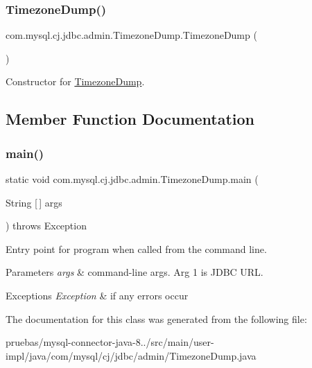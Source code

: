 \subsubsection{\texorpdfstring{Timezone\+Dump()}{TimezoneDump()}}
{\footnotesize\ttfamily com.\+mysql.\+cj.\+jdbc.\+admin.\+Timezone\+Dump.\+Timezone\+Dump (\begin{DoxyParamCaption}{ }\end{DoxyParamCaption})}

Constructor for \mbox{\hyperlink{classcom_1_1mysql_1_1cj_1_1jdbc_1_1admin_1_1_timezone_dump}{Timezone\+Dump}}. 

\subsection{Member Function Documentation}
\mbox{\label{classcom_1_1mysql_1_1cj_1_1jdbc_1_1admin_1_1_timezone_dump_a49fa078091ac273b24d35f0077227ab4}} 
\subsubsection{\texorpdfstring{main()}{main()}}
{\footnotesize\ttfamily static void com.\+mysql.\+cj.\+jdbc.\+admin.\+Timezone\+Dump.\+main (\begin{DoxyParamCaption}\item[{String \mbox{[}$\,$\mbox{]}}]{args }\end{DoxyParamCaption}) throws Exception\hspace{0.3cm}{\ttfamily [static]}}

Entry point for program when called from the command line.


\begin{DoxyParams}{Parameters}
{\em args} & command-\/line args. Arg 1 is J\+D\+BC U\+RL. \\
\hline
\end{DoxyParams}

\begin{DoxyExceptions}{Exceptions}
{\em Exception} & if any errors occur \\
\hline
\end{DoxyExceptions}


The documentation for this class was generated from the following file\+:\begin{DoxyCompactItemize}
\item 
pruebas/mysql-\/connector-\/java-\/8../src/main/user-\/impl/java/com/mysql/cj/jdbc/admin/Timezone\+Dump.\+java\end{DoxyCompactItemize}
